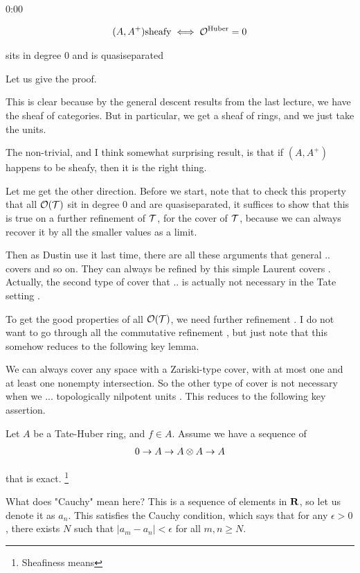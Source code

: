 \begin{unfinished}{0:00}
{\begin{theorem}
\begin{align*}
(A, A^+) \text{sheafy} \iff \mathcal O^{\mathrm{Huber}} = 0
\end{align*}

sits in degree 0 and is quasiseparated

\begin{sketch}
Let us give the proof. 
\end{sketch}
This is clear because by the general descent results from the last lecture, we have the sheaf of categories. But in particular, we get a sheaf of rings, and we just take the units. 

The non-trivial, and I think somewhat surprising result, is that if $(A, A^+)$ happens to be sheafy, then it is the right thing.

Let me get the other direction. Before we start, note that to check this property that all $\mathcal O(\mathcal T)$ sit in degree 0 and are quasiseparated, it suffices to show that this is true on a further refinement of $\mathcal T$, for the cover of $\mathcal T$, because we can always recover it by all the smaller values as a limit.

Then as Dustin use it last time, there are all these arguments that general .. covers and so on. They can always be refined by this simple Laurent covers . Actually, the second type of cover that .. is actually not necessary in the Tate setting .

To get the good properties of all $\mathcal O(\mathcal T)$, we need further refinement . I do not want to go through all the commutative refinement , but just note that this somehow reduces to the following key lemma.

%
We can always cover any space with a Zariski-type cover, with at most one and at least one nonempty intersection. So the other type of cover is not necessary when we ... topologically nilpotent units . This reduces to the following key assertion.


\begin{lemma}
Let $A$ be a Tate-Huber ring, and $f \in A$. 
Assume we have a sequence of 
\begin{align*}
0 \to A \to A \otimes A \to A 
\end{align*}

that is exact. \footnote{Sheafiness means }
\end{lemma}

What does "Cauchy" mean here? This is a sequence of elements in $\mathbf R$, so let us denote it as $a_n$. 
This satisfies the Cauchy condition, which says that for any $\epsilon > 0$, there exists $N$ such that $|a_m - a_n| < \epsilon$ for all $m, n \geq N$. 



\end{theorem}}
\end{unfinished}
